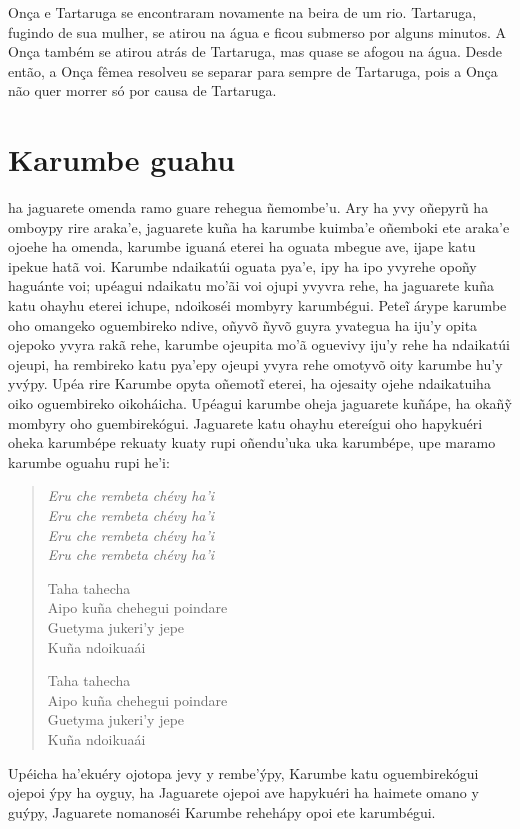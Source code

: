 Onça e Tartaruga se encontraram novamente na beira de um rio. Tartaruga, fugindo de sua mulher, se atirou na água e ficou submerso por alguns minutos. A Onça também se atirou atrás de Tartaruga, mas quase se afogou na água.
Desde então, a Onça fêmea resolveu se separar para sempre de Tartaruga,
pois a Onça não quer morrer só por causa de Tartaruga.

\chapter{Karumbe guahu}

 ha jaguarete omenda ramo guare rehegua ñemombe'u. Ary ha yvy
oñepyrũ ha omboypy rire araka'e, jaguarete kuña ha karumbe kuimba'e
oñemboki ete araka'e ojoehe ha omenda, karumbe iguaná eterei ha oguata
mbegue ave, ijape katu ipekue hatã voi. Karumbe ndaikatúi oguata pya'e,
ipy ha ipo yvyrehe opoñy haguánte voi; upéagui ndaikatu mo'ãi voi ojupi
yvyvra rehe, ha jaguarete kuña katu ohayhu eterei ichupe, ndoikoséi
mombyry karumbégui. Peteĩ árype karumbe oho omangeko oguembireko ndive,
oñyvõ ñyvõ guyra yvategua ha iju'y opita ojepoko yvyra rakã rehe,
karumbe ojeupita mo'ã oguevivy iju'y rehe ha ndaikatúi ojeupi, ha
rembireko katu pya'epy ojeupi yvyra rehe omotyvõ oity karumbe hu'y
yvýpy. Upéa rire Karumbe opyta oñemotĩ eterei, ha ojesaity ojehe
ndaikatuiha oiko oguembireko oikoháicha. Upéagui karumbe oheja jaguarete
kuñápe, ha okañỹ mombyry oho guembirekógui. Jaguarete katu ohayhu
etereígui oho hapykuéri oheka karumbépe rekuaty kuaty rupi oñendu'uka
uka karumbépe, upe maramo karumbe oguahu rupi he'i:

\begin{verse}
\itshape
Eru che rembeta chévy ha'i\\
Eru che rembeta chévy ha'i\\
Eru che rembeta chévy ha'i\\
Eru che rembeta chévy ha'i

\pagebreak       
Taha tahecha\\
Aipo kuña chehegui poindare\\
Guetyma jukeri'y jepe\\
Kuña ndoikuaái
       
Taha tahecha\\
Aipo kuña chehegui poindare\\
Guetyma jukeri'y jepe\\
Kuña ndoikuaái
\end{verse}


Upéicha ha'ekuéry ojotopa jevy y rembe'ýpy, Karumbe katu oguembirekógui 
ojepoi ýpy ha oyguy, ha Jaguarete ojepoi ave hapykuéri ha haimete omano
y guýpy, Jaguarete nomanoséi Karumbe rehehápy opoi ete karumbégui.

